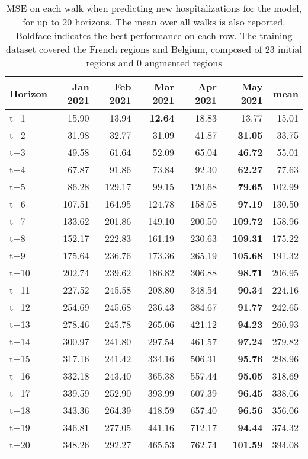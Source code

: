 \begin{table}[H]
\centering
\caption{MSE on each walk when predicting new hospitalizations for the model, for up to 20 horizons. The mean over all walks is also reported. Boldface indicates the best performance on each row. The training dataset covered the French regions and Belgium, composed of 23 initial regions and 0 augmented regions }
\label{tab:MSE_walk_baseline}
\begin{tabular}{lrrrrrr}
\toprule
Horizon &  Jan 2021 &  Feb 2021 &  Mar 2021 &  Apr 2021 &  May 2021 &   mean \\
\midrule
t+1  & 15.90  & 13.94  & \textbf{12.64}  & 18.83  & 13.77  & 15.01  \\
t+2  & 31.98  & 32.77  & 31.09  & 41.87  & \textbf{31.05}  & 33.75  \\
t+3  & 49.58  & 61.64  & 52.09  & 65.04  & \textbf{46.72}  & 55.01  \\
t+4  & 67.87  & 91.86  & 73.84  & 92.30  & \textbf{62.27}  & 77.63  \\
t+5  & 86.28  & 129.17  & 99.15  & 120.68  & \textbf{79.65}  & 102.99  \\
t+6  & 107.51  & 164.95  & 124.78  & 158.08  & \textbf{97.19}  & 130.50  \\
t+7  & 133.62  & 201.86  & 149.10  & 200.50  & \textbf{109.72}  & 158.96  \\
t+8  & 152.17  & 222.83  & 161.19  & 230.63  & \textbf{109.31}  & 175.22  \\
t+9  & 175.64  & 236.76  & 173.36  & 265.19  & \textbf{105.68}  & 191.32  \\
t+10  & 202.74  & 239.62  & 186.82  & 306.88  & \textbf{98.71}  & 206.95  \\
t+11  & 227.52  & 245.58  & 208.80  & 348.54  & \textbf{90.34}  & 224.16  \\
t+12  & 254.69  & 245.68  & 236.43  & 384.67  & \textbf{91.77}  & 242.65  \\
t+13  & 278.46  & 245.78  & 265.06  & 421.12  & \textbf{94.23}  & 260.93  \\
t+14  & 300.97  & 241.80  & 297.54  & 461.57  & \textbf{97.24}  & 279.82  \\
t+15  & 317.16  & 241.42  & 334.16  & 506.31  & \textbf{95.76}  & 298.96  \\
t+16  & 332.18  & 243.40  & 365.38  & 557.44  & \textbf{95.05}  & 318.69  \\
t+17  & 339.59  & 252.90  & 393.99  & 607.39  & \textbf{96.45}  & 338.06  \\
t+18  & 343.36  & 264.39  & 418.59  & 657.40  & \textbf{96.56}  & 356.06  \\
t+19  & 346.81  & 277.05  & 441.16  & 712.17  & \textbf{94.44}  & 374.32  \\
t+20  & 348.26  & 292.27  & 465.53  & 762.74  & \textbf{101.59}  & 394.08  \\

\bottomrule
\end{tabular}
\end{table}
